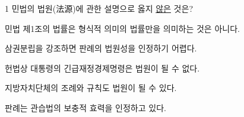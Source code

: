 \begin{question}{1}
민법의 법원(法源)에 관한 설명으로 옳지 \uline{않은} 것은?
\begin{choices}
  \item 민법 제1조의 법률은 형식적 의미의 법률만을 의미하는 것은 아니다.
  \item 삼권분립을 강조하면 판례의 법원성을 인정하기 어렵다.
  \item 헌법상 대통령의 긴급재정경제명령은 법원이 될 수 없다.
  \item 지방자치단체의 조례와 규칙도 법원이 될 수 있다.
  \item 판례는 관습법의 보충적 효력을 인정하고 있다.
\end{choices}
\end{question}
